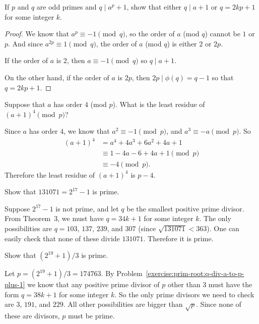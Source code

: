 \label{exercise:prim-root:q-div-a-to-p-plus-1}
If $p$ and $q$ are odd primes and $q\mid a^p + 1$, show that either
$q\mid a + 1$ or $q = 2kp + 1$ for some integer $k$.
\begin{proof}
  We know that $a^p\equiv-1\pmod{q}$, so the order of $a$ (mod $q$)
  cannot be $1$ or $p$. And since $a^{2p}\equiv1\pmod{q}$, the order
  of $a$ (mod $q$) is either $2$ or $2p$.

  If the order of $a$ is $2$, then $a\equiv-1\pmod{q}$ so
  $q\mid a + 1$.

  On the other hand, if the order of $a$ is $2p$, then
  $2p\mid\phi(q) = q - 1$ so that $q = 2kp + 1$.
\end{proof}

 Suppose that $a$ has order $4$ (mod $p$). What is the
least residue of $(a + 1)^4\pmod{p}$?
\begin{solution}
  Since $a$ has order $4$, we know that $a^2\equiv-1\pmod{p}$, and
  $a^3\equiv-a\pmod{p}$. So
  \begin{align*}
    (a + 1)^4
    &= a^4 + 4a^3 + 6a^2 + 4a + 1 \\
    &\equiv 1 - 4a - 6 + 4a + 1 \pmod{p} \\
    &\equiv -4 \pmod{p}.
  \end{align*}
  Therefore the least residue of $(a + 1)^4$ is $p - 4$.
\end{solution}

 Show that $131071 = 2^{17} - 1$ is prime.
\begin{solution}
  Suppose $2^{17} - 1$ is not prime, and let $q$ be the smallest
  positive prime divisor. From Theorem~3, we must have $q = 34k + 1$
  for some integer $k$. The only possibilities are $q = 103$, $137$,
  $239$, and $307$ (since $\sqrt{131071}<363$). One can easily check
  that none of these divide $131071$. Therefore it is prime.
\end{solution}

 Show that $(2^{19} + 1)/3$ is prime.
\begin{solution}
  Let $p = (2^{19} + 1)/3 = 174763$. By
  Problem~\ref{exercise:prim-root:q-div-a-to-p-plus-1} we know that
  any positive prime divisor of $p$ other than $3$ must have the form
  $q = 38k + 1$ for some integer $k$. So the only prime divisors we
  need to check are $3$, $191$, and $229$. All other possibilities are
  bigger than $\sqrt{p}$. Since none of these are divisors, $p$ must
  be prime.
\end{solution}

